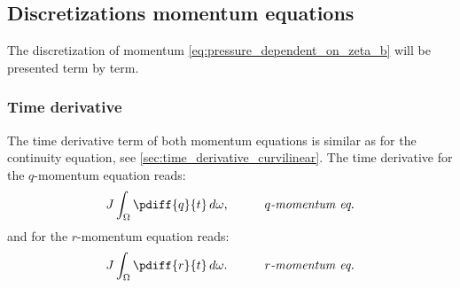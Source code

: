 \subsection{Discretizations momentum equations}
The discretization of momentum \autoref{eq:pressure_dependent_on_zeta_b} will be presented term by term.
\subsubsection{Time derivative}
The time derivative term of both momentum equations is similar as for the continuity equation, see \autoref{sec:time_derivative_curvilinear}.
The time derivative for the $q$-momentum equation reads:
\begin{align}
    &J \int_{\Omega} \pdiff{q}{t}\, d\omega,& \qquad \textit{$q$-momentum eq.}
\end{align}
and for the $r$-momentum equation reads:
\begin{align}
    &J \int_{\Omega} \pdiff{r}{t}\, d\omega.& \qquad \textit{$r$-momentum eq.}
\end{align}

